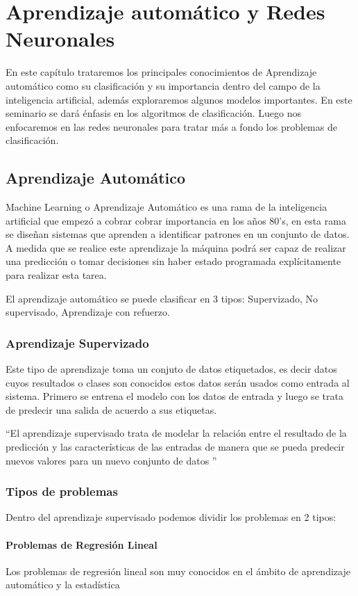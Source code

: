 \chapter{Aprendizaje automático y Redes Neuronales}

En este capítulo trataremos los principales conocimientos de Aprendizaje automático como su clasificación y su importancia dentro del campo de la inteligencia artificial, además exploraremos algunos modelos importantes. 
En este seminario se dará énfasis en los algoritmos de clasificación. Luego nos enfocaremos en las redes neuronales para tratar más a fondo los problemas de clasificación.

\section{Aprendizaje Automático}
Machine Learning o Aprendizaje Automático es una rama de la inteligencia artificial que empezó a cobrar cobrar importancia en los años 80's, en esta rama se diseñan sistemas que aprenden a identificar patrones en un conjunto de datos. A medida que se realice este aprendizaje la máquina podrá ser capaz de realizar una predicción o tomar decisiones sin haber estado programada explícitamente para realizar esta tarea.


El aprendizaje automático se puede clasificar en 3 tipos: Supervizado, No supervisado, Aprendizaje con refuerzo.\cite{WEBSITE:2}
\subsection{Aprendizaje Supervizado}
Este tipo de aprendizaje  toma un conjuto de datos etiquetados, es decir datos cuyos resultados o clases son conocidos estos datos serán usados como entrada al sistema. Primero se entrena el modelo con los datos de entrada y luego se trata de predecir  una salida de acuerdo a sus etiquetas.

 \textquotedblleft El aprendizaje supervisado trata de modelar la relación entre el resultado de la predicción y las características de las entradas de manera que se pueda predecir nuevos valores para un nuevo conjunto de datos \textquotedblright \cite{WEBSITE:1}
\subsection*{Tipos de problemas}
Dentro del aprendizaje supervisado podemos dividir los problemas en 2 tipos:
\subsubsection*{Problemas de Regresión Lineal}
Los problemas de regresión lineal son muy conocidos en el ámbito de aprendizaje automático y la estadística 

